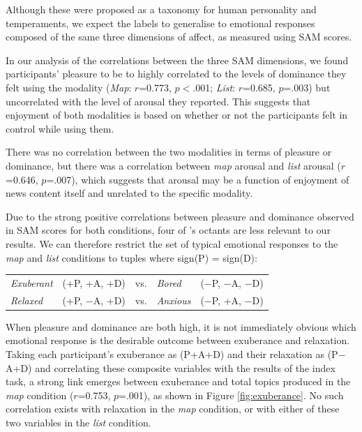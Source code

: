 Although these were proposed as a taxonomy for human personality and temperaments, we expect the labels to generalise to emotional responses composed of the same three dimensions of affect, as measured using SAM scores.

In our analysis of the correlations between the three SAM dimensions, we found participants' pleasure to be to highly correlated to the levels of dominance they felt using the modality (\textit{Map}: $r$=0.773, $p<$.001; \textit{List}: $r$=0.685, $p$=.003) but uncorrelated with the level of arousal they reported. This suggests that enjoyment of both modalities is based on whether or not the participants felt in control while using them.

There was no correlation between the two modalities in terms of pleasure or dominance, but there was a correlation between \textit{map} arousal and \textit{list} arousal ($r$=0.646, $p$=.007), which suggests that arousal may be a function of enjoyment of news content itself and unrelated to the specific modality.

Due to the strong positive correlations between pleasure and dominance observed in SAM scores for both conditions, four of \citeauthor{emotionbasedtheory}'s octants are less relevant to our results. We can therefore restrict the set of typical emotional responses to the \textit{map} and \textit{list} conditions to tuples where sign(P) = sign(D):

\begin{table}[htbp!]
\centering
\begin{tabular}{lllll}
\textit{Exuberant} & (+P, +A, +D) & vs. & \textit{Bored} & ($-$P, $-$A, $-$D) \\
\textit{Relaxed} & (+P, $-$A, +D) & vs. & \textit{Anxious} & ($-$P, +A, $-$D) \\
\end{tabular}
\end{table}

When pleasure and dominance are both high, it is not immediately obvious which emotional response is the desirable outcome between exuberance and relaxation. Taking each participant's exuberance as (P+A+D) and their relaxation as (P$-$A+D) and correlating these composite variables with the results of the index task, a strong link emerges between exuberance and total topics produced in the \textit{map} condition ($r$=0.753, $p$=.001), as shown in Figure \ref{fig:exuberance}. No such correlation exists with relaxation in the \textit{map} condition, or with either of these two variables in the \textit{list} condition.\\


